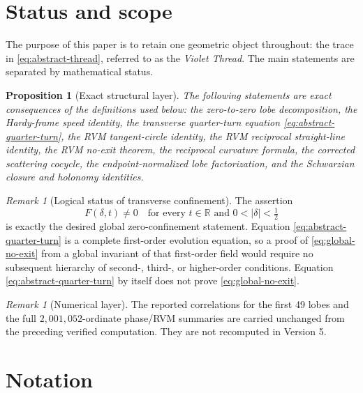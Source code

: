 \documentclass[11pt]{amsart}
\numberwithin{equation}{section}
\newtheorem{proposition}[theorem]{Proposition}
\theoremstyle{definition}
\theoremstyle{remark}
\newtheorem{remark}[theorem]{Remark}
\newcommand{\R}{\mathbb R}
\begin{document}
\section{Status and scope}
\label{sec:status}

The purpose of this paper is to retain one geometric object throughout: the trace in \eqref{eq:abstract-thread}, referred to as the \emph{Violet Thread}.  The main statements are separated by mathematical status.

\begin{proposition}[Exact structural layer]
\label{prop:status-exact}
The following statements are exact consequences of the definitions used below: the zero-to-zero lobe decomposition, the Hardy-frame speed identity, the transverse quarter-turn equation \eqref{eq:abstract-quarter-turn}, the RVM tangent-circle identity, the RVM reciprocal straight-line identity, the RVM no-exit theorem, the reciprocal curvature formula, the corrected scattering cocycle, the endpoint-normalized lobe factorization, and the Schwarzian closure and holonomy identities.
\end{proposition}

\begin{remark}[Logical status of transverse confinement]
\label{rem:status-rh}
The assertion
\begin{equation}
F(\delta,t)\neq0
\quad\text{for every }t\in\R\text{ and }0<|\delta|<\tfrac12
\label{eq:global-no-exit}
\end{equation}
is exactly the desired global zero-confinement statement.  Equation \eqref{eq:abstract-quarter-turn} is a complete first-order evolution equation, so a proof of \eqref{eq:global-no-exit} from a global invariant of that first-order field would require no subsequent hierarchy of second-, third-, or higher-order conditions.  Equation \eqref{eq:abstract-quarter-turn} by itself does not prove \eqref{eq:global-no-exit}.
\end{remark}

\begin{remark}[Numerical layer]
\label{rem:status-numerical}
The reported correlations for the first 49 lobes and the full $2{,}001{,}052$-ordinate phase/RVM summaries are carried unchanged from the preceding verified computation.  They are not recomputed in Version 5.
\end{remark}

\section{Notation}
\label{sec:notation}
\end{document}
